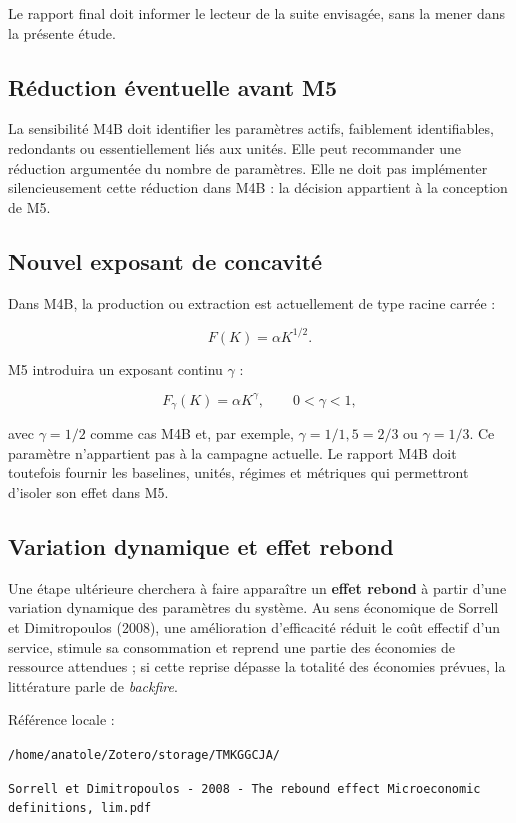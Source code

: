 \documentclass[11pt,a4paper]{article}
\newcommand{\file}[1]{\nolinkurl{#1}}
\newcommand{\term}[1]{\textbf{\color{navy}#1}}
\begin{document}
Le rapport final doit informer le lecteur de la suite envisagée, sans la mener
dans la présente étude.

\subsection{Réduction éventuelle avant M5}

La sensibilité M4B doit identifier les paramètres actifs, faiblement
identifiables, redondants ou essentiellement liés aux unités. Elle peut
recommander une réduction argumentée du nombre de paramètres. Elle ne doit pas
implémenter silencieusement cette réduction dans M4B : la décision appartient
à la conception de M5.

\subsection{Nouvel exposant de concavité}

Dans M4B, la production ou extraction est actuellement de type racine carrée :

\[
  F(K)=\alpha K^{1/2}.
\]

M5 introduira un exposant continu $\gamma$ :

\[
  F_{\gamma}(K)=\alpha K^{\gamma},
  \qquad 0<\gamma<1,
\]

avec $\gamma=1/2$ comme cas M4B et, par exemple, $\gamma=1/1{,}5=2/3$ ou
$\gamma=1/3$. Ce paramètre n'appartient pas à la campagne actuelle. Le rapport
M4B doit toutefois fournir les baselines, unités, régimes et métriques qui
permettront d'isoler son effet dans M5.

\subsection{Variation dynamique et effet rebond}

Une étape ultérieure cherchera à faire apparaître un \term{effet rebond} à
partir d'une variation dynamique des paramètres du système. Au sens économique
de Sorrell et Dimitropoulos (2008), une amélioration d'efficacité réduit le coût
effectif d'un service, stimule sa consommation et reprend une partie des
économies de ressource attendues ; si cette reprise dépasse la totalité des
économies prévues, la littérature parle de \emph{backfire}.

Référence locale :

\begin{center}
\file{/home/anatole/Zotero/storage/TMKGGCJA/}\par
\file{Sorrell et Dimitropoulos - 2008 - The rebound effect Microeconomic definitions, lim.pdf}
\end{center}
\end{document}
